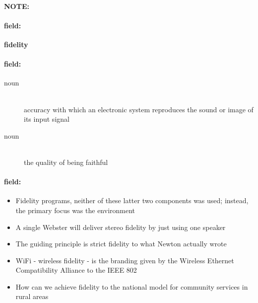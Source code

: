 \documentclass[12pt]{article}
\newenvironment{note}{\paragraph{NOTE:}}{}
\newenvironment{field}{\paragraph{field:}}{}
\begin{document}
\begin{note}
\begin{field}
\textbf{\large fidelity}
\end{field}


\begin{field}
\begin{description}
\item[noun] \hfill \\ 
accuracy with which an electronic system reproduces the sound or image of its input signal

\item[noun] \hfill \\ 
the quality of being faithful

\end{description}
\end{field}

\begin{field}
\begin{itemize}
\item Fidelity programs, neither of these latter two components was used; instead, the primary focus was the environment
\item A single Webster will deliver stereo fidelity by just using one speaker
\item The guiding principle is strict fidelity to what Newton actually wrote
\item WiFi - wireless fidelity - is the branding given by the Wireless Ethernet Compatibility Alliance to the IEEE 802
\item How can we achieve fidelity to the national model for community services in rural areas
\end{itemize}
\end{field}
\end{note}
\end{document}
